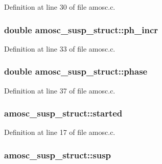 Definition at line 30 of file amosc.\+c.

\subsubsection[{\texorpdfstring{ph\+\_\+incr}{ph_incr}}]{\setlength{\rightskip}{0pt plus 5cm}double amosc\+\_\+susp\+\_\+struct\+::ph\+\_\+incr}\hypertarget{structamosc__susp__struct_aae2b6b568712656dab8f7b8d16b7485a}{}\label{structamosc__susp__struct_aae2b6b568712656dab8f7b8d16b7485a}


Definition at line 33 of file amosc.\+c.

\subsubsection[{\texorpdfstring{phase}{phase}}]{\setlength{\rightskip}{0pt plus 5cm}double amosc\+\_\+susp\+\_\+struct\+::phase}\hypertarget{structamosc__susp__struct_a650216b1005a0af1b4b4fcb57a63ac55}{}\label{structamosc__susp__struct_a650216b1005a0af1b4b4fcb57a63ac55}


Definition at line 37 of file amosc.\+c.

\subsubsection[{\texorpdfstring{started}{started}}]{ amosc\+\_\+susp\+\_\+struct\+::started}\hypertarget{structamosc__susp__struct_a4f1d48f0cc20264f3e1303341d28db6e}{}\label{structamosc__susp__struct_a4f1d48f0cc20264f3e1303341d28db6e}


Definition at line 17 of file amosc.\+c.

\subsubsection[{\texorpdfstring{susp}{susp}}]{ amosc\+\_\+susp\+\_\+struct\+::susp}\hypertarget{structamosc__susp__struct_af4e3de20661233648de12882d47ad426}{}\label{structamosc__susp__struct_af4e3de20661233648de12882d47ad426}


